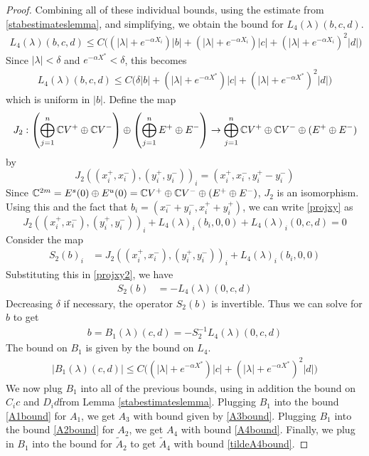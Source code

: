 \documentclass[thesis.tex]{subfiles}
\begin{document}
\begin{lemma}
\begin{proof}
Combining all of these individual bounds, using the estimate from \cref{stabestimateslemma}, and simplifying, we obtain the bound for $L_4(\lambda)(b, c, d)$.
\begin{align*}
L_4(\lambda)(b, c, d) \leq 
C\Big( (|\lambda| + e^{-\alpha X_i})|b| + (|\lambda|+e^{-\alpha X_i})|c| + (|\lambda| + e^{-\alpha X_i})^2 |d|  \Big) 
\end{align*}
Since $|\lambda| < \delta$ and $e^{-\alpha X^*} < \delta$, this becomes
\begin{align*}
L_4(\lambda)(b, c, d) \leq 
C\Big( \delta |b| + (|\lambda|+e^{-\alpha X^*})|c| + (|\lambda| + e^{-\alpha X^*})^2 |d| \Big) 
\end{align*}
which is uniform in $|b|$. Define the map
\[
J_2: \left( \bigoplus_{j=1}^n \mathbb{C} V^+ \oplus \mathbb{C} V^- \right) \oplus
\left( \bigoplus_{j=1}^n E^+ \oplus E^- \right) 
\rightarrow \bigoplus_{j=1}^n \mathbb{C} V^+ \oplus \mathbb{C} V^- \oplus (E^+ \oplus E^-)
\]
by 
\[
J_2( (x_i^+, x_i^-),(y_i^+, y_i^-))_i = ( x_i^+, x_i^-, y_i^+ - y_i^- )
\]
Since $\mathbb{C}^{2m} = E^s(0) \oplus E^u(0) = \mathbb{C} V^+ \oplus \mathbb{C} V^- \oplus (E^+ \oplus E^-)$, $J_2$ is an isomorphism. Using this and the fact that $b_i = (x_i^- + y_i^-, x_i^+ + y_i^+)$, we can write \eqref{projxy} as
\begin{equation}\label{projxy2}
J_2( (x_i^+, x_i^-),(y_i^+, y_i^-))_i 
+ L_4(\lambda)_i(b_i, 0, 0) + L_4(\lambda)_i(0, c, d) = 0
\end{equation}
Consider the map
\begin{align*}
S_2(b)_i &= J_2( (x_i^+, x_i^-),(y_i^+, y_i^-))_i 
+ L_4(\lambda)_i(b_i, 0, 0) 
\end{align*}
Substituting this in \eqref{projxy2}, we have
\begin{align*}
S_2(b) &= -L_4(\lambda)(0, c, d)
\end{align*}
Decreasing $\delta$ if necessary, the operator $S_2(b)$ is invertible. Thus we can solve for $b$ to get
\begin{align}
b = B_1(\lambda)(c,d) 
= -S_2^{-1} L_4(\lambda)(0, c, d)
\end{align}
The bound on $B_1$ is given by the bound on $L_4$.
\begin{align*}
|B_1(\lambda)(c, d)| \leq C\Big( (|\lambda|+e^{-\alpha X^*})|c| + (|\lambda| + e^{-\alpha X^*})^2 |d| \Big) 
\end{align*}
We now plug $B_1$ into all of the previous bounds, using in addition the bound on $C_i c$ and $D_i d $from Lemma \ref{stabestimateslemma}. Plugging $B_1$ into the bound \eqref{A1bound} for $A_1$, we get $A_3$ with bound given by \cref{A3bound}. Plugging $B_1$ into the bound \eqref{A2bound} for $A_2$, we get $A_4$ with bound \cref{A4bound}. Finally, we plug in $B_1$ into the bound for $\tilde{A}_2$ to get $\tilde{A}_4$ with bound \cref{tildeA4bound}.
\end{proof}
\end{lemma}
\end{document}
